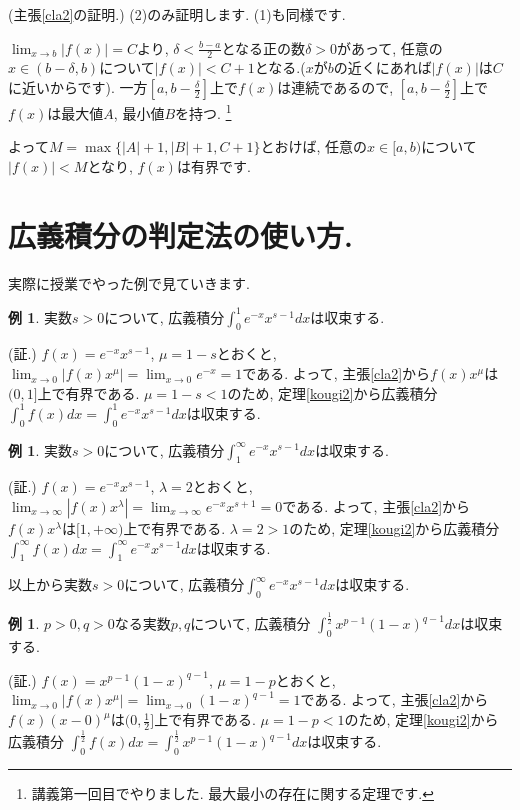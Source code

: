 \documentclass[dvipdfmx,a4paper,11pt]{article}
\theoremstyle{definition}
\newtheorem{exa}[thm]{例}
\begin{document}
 \hspace{-18pt}(主張\ref{cla2}の証明.)
 (2)のみ証明します. (1)も同様です.
 
 $\lim_{x \rightarrow b} |f(x)|=C$より, $\delta<\frac{b-a}{2}$となる正の数$\delta>0$があって, 任意の$x \in (b - \delta ,b)$について$|f(x)| < C+1$となる.($x$が$b$の近くにあれば$|f(x)|$は$C$に近いからです).
 一方$[a,b-\frac{\delta}{2}]$上で$f(x)$は連続であるので,
$[a,b-\frac{\delta}{2}]$上で$f(x)$は最大値$A$, 最小値$B$を持つ.
\footnote{講義第一回目でやりました. 最大最小の存在に関する定理です.}

よって$M = \max\{ |A|+1, |B|+1, C+1\}$とおけば, 任意の$x \in  [a,b) $について$|f(x)| < M$となり, $f(x)$は有界です.



\section{広義積分の判定法の使い方.}

実際に授業でやった例で見ていきます.

  \begin{exa}
実数$s>0$について, 広義積分$\int_{0}^{1} e^{-x}x^{s-1}dx$は収束する.

\hspace{-18pt}(証.)
$f(x) = e^{-x}x^{s-1}$, $\mu=1-s$とおくと, $\lim_{x \rightarrow 0} |f(x)x^{\mu}| =\lim_{x \rightarrow 0} e^{-x} =1$である. 
よって, 主張\ref{cla2}から$f(x)x^{\mu}$は$(0,1]$上で有界である.
$\mu=1-s<1$のため, 定理\ref{kougi2}から広義積分$\int_{0}^{1}f(x)dx=\int_{0}^{1} e^{-x}x^{s-1} dx$は収束する.
 \end{exa}
 
   \begin{exa}
実数$s>0$について, 広義積分$\int_{1}^{\infty} e^{-x}x^{s-1}dx$は収束する.

\hspace{-18pt}(証.)
$f(x) = e^{-x}x^{s-1}$, $\lambda=2$とおくと, $\lim_{x \rightarrow \infty} |f(x) x^{\lambda}| = \lim_{x \rightarrow \infty} e^{-x}x^{s+1} =0$である.
よって, 主張\ref{cla2}から$f(x)x^{\lambda}$は$[1,+\infty)$上で有界である.
$\lambda=2>1$のため, 定理\ref{kougi2}から広義積分$\int_{1}^{\infty} f(x)dx=\int_{1}^{\infty} e^{-x}x^{s-1}dx$は収束する.

 \end{exa}
 
 以上から実数$s>0$について, 広義積分$\int_{0}^{\infty} e^{-x}x^{s-1}dx $は収束する.
 
\begin{exa}
$p>0, q>0$なる実数$p,q$について, 広義積分
$\int^{\frac{1}{2}}_{0}x^{p-1}(1-x)^{q-1} dx$は収束する.

\hspace{-18pt}(証.)
$f(x) = x^{p-1}(1-x)^{q-1}$, $\mu=1-p$とおくと, $\lim_{x \rightarrow 0} |f(x) x^{\mu}| =\lim_{x \rightarrow 0} (1-x)^{q-1}=1$である.
よって, 主張\ref{cla2}から$f(x)(x-0)^{\mu}$は$(0, \frac{1}{2}]$上で有界である.
$\mu=1-p<1$のため, 定理\ref{kougi2}から広義積分
$\int_{0}^{\frac{1}{2}}f(x) dx = \int^{\frac{1}{2}}_{0}x^{p-1}(1-x)^{q-1} dx$は収束する.

 \end{exa}
 
\end{document}
